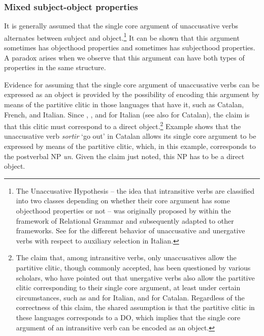\documentclass[output=paper,hidelinks]{langscibook}
\begin{document}
\subsubsection{Mixed subject-object properties}
\label{sec:Romance:3.1.3}

It is generally assumed that the single core argument of unaccusative verbs alternates between subject and object.\footnote{The Unaccusative Hypothesis  -- the idea that intransitive verbs are classified into two classes depending on whether their core argument has some objecthood properties or not --  was originally proposed by \citet{Perlmutter1978} within the framework of Relational Grammar and subsequently adapted to other frameworks. See  for the different behavior of unaccusative and unergative verbs with respect to auxiliary selection in Italian.} It can be shown that this argument sometimes has objecthood properties and sometimes has subjecthood properties. A paradox arises when we observe that this argument can have both types of properties in the same structure. 

Evidence for assuming that the single core argument of unaccusative verbs can be expressed as an object is provided by the possibility of encoding this argument by means of the partitive clitic in those languages that have it, such as Catalan, French, and Italian. Since \citet{Perlmutter1983}, \citet{Rosen1984}, and \citet{Burzio1986} for Italian (see also \citealt{alsina1996the-role} for Catalan), the claim is that this clitic must correspond to a direct object.\footnote{The claim that, among intransitive verbs, only unaccusatives allow the partitive clitic, though commonly accepted, has been questioned by various scholars, who have pointed out that unergative verbs also allow the partitive clitic corresponding to their single core argument, at least under certain circumstances, such as \citet{Lonzi1986} and \citet{Saccon1995} for Italian, \citet{CortesGavarro1997} and \citet{AlsinaYang2018} for Catalan. Regardless of the correctness of this claim, the shared assumption is that the partitive clitic in these languages corresponds to a DO, which implies that the single core argument of an intransitive verb can be encoded as an object.} Example  shows that the unaccusative verb \textit{sortir} `go out' in Catalan allows its single core argument to be expressed by means of the partitive clitic, which, in this example, corresponds to the postverbal NP \textit{un}. Given the claim just noted, this NP has to be a direct object.
\end{document}
